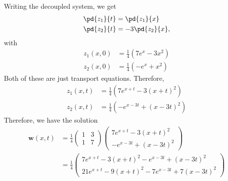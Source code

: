 \documentclass[10pt]{mypackage}
\begin{document}
\begin{example}
  Writing the decoupled system, we get
  \begin{align*}
    \pd{z_1}{t} &= \pd{z_1}{x}\\
    \pd{z_2}{t} &= -3\pd{z_2}{x},
  \end{align*}
  with
  \begin{align*}
    z_1\left( x,0 \right) &= \frac{1}{4}\left( 7e^{x} - 3x^2 \right)\\
    z_2\left( x,0 \right) &= \frac{1}{4}\left( -e^{x} + x^2 \right)
  \end{align*}
  Both of these are just transport equations. Therefore,
  \begin{align*}
    z_1\left( x,t \right) &= \frac{1}{4}\left( 7e^{x + t} - 3\left( x+t \right)^2 \right)\\
    z_2\left( x,t \right) &= \frac{1}{4}\left( -e^{x - 3t} + \left( x-3t \right)^2 \right)
  \end{align*}
  Therefore, we have the solution
  \begin{align*}
    \mathbf{w}\left( x,t \right) &= \frac{1}{4} \begin{pmatrix}1 & 3 \\ 1 & 7\end{pmatrix} \begin{pmatrix}7e^{x + t} - 3\left( x +t \right)^2\\ -e^{x-3t} + \left( x-3t \right)^2\end{pmatrix}\\
                                 &= \frac{1}{4} \begin{pmatrix}7e^{x+t} - 3\left( x + t \right)^2 - e^{x-3t} + \left( x-3t \right)^2 \\ 21e^{x + t} - 9\left( x + t \right)^2 - 7e^{x-3t} + 7\left( x-3t \right)^2\end{pmatrix}
  \end{align*}
\end{example}
\end{document}
